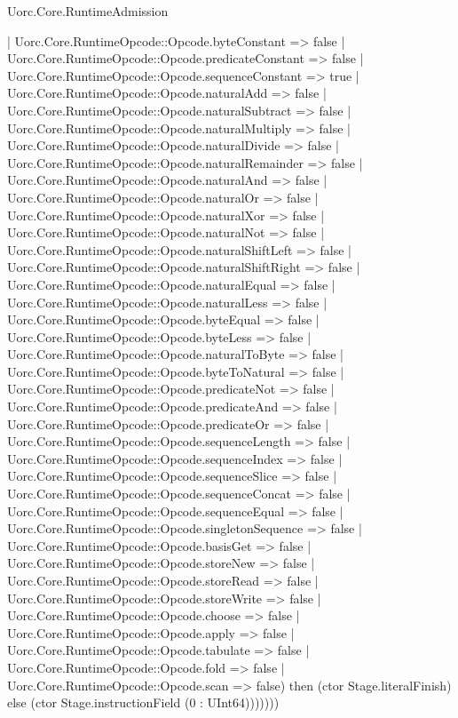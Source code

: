 \begin{lexlean}{Uorc.Core.RuntimeAdmission}
\begin{semanticmodule}
{              | Uorc.Core.RuntimeOpcode::Opcode.byteConstant => false
              | Uorc.Core.RuntimeOpcode::Opcode.predicateConstant => false
              | Uorc.Core.RuntimeOpcode::Opcode.sequenceConstant => true
              | Uorc.Core.RuntimeOpcode::Opcode.naturalAdd => false
              | Uorc.Core.RuntimeOpcode::Opcode.naturalSubtract => false
              | Uorc.Core.RuntimeOpcode::Opcode.naturalMultiply => false
              | Uorc.Core.RuntimeOpcode::Opcode.naturalDivide => false
              | Uorc.Core.RuntimeOpcode::Opcode.naturalRemainder => false
              | Uorc.Core.RuntimeOpcode::Opcode.naturalAnd => false
              | Uorc.Core.RuntimeOpcode::Opcode.naturalOr => false
              | Uorc.Core.RuntimeOpcode::Opcode.naturalXor => false
              | Uorc.Core.RuntimeOpcode::Opcode.naturalNot => false
              | Uorc.Core.RuntimeOpcode::Opcode.naturalShiftLeft => false
              | Uorc.Core.RuntimeOpcode::Opcode.naturalShiftRight => false
              | Uorc.Core.RuntimeOpcode::Opcode.naturalEqual => false
              | Uorc.Core.RuntimeOpcode::Opcode.naturalLess => false
              | Uorc.Core.RuntimeOpcode::Opcode.byteEqual => false
              | Uorc.Core.RuntimeOpcode::Opcode.byteLess => false
              | Uorc.Core.RuntimeOpcode::Opcode.naturalToByte => false
              | Uorc.Core.RuntimeOpcode::Opcode.byteToNatural => false
              | Uorc.Core.RuntimeOpcode::Opcode.predicateNot => false
              | Uorc.Core.RuntimeOpcode::Opcode.predicateAnd => false
              | Uorc.Core.RuntimeOpcode::Opcode.predicateOr => false
              | Uorc.Core.RuntimeOpcode::Opcode.sequenceLength => false
              | Uorc.Core.RuntimeOpcode::Opcode.sequenceIndex => false
              | Uorc.Core.RuntimeOpcode::Opcode.sequenceSlice => false
              | Uorc.Core.RuntimeOpcode::Opcode.sequenceConcat => false
              | Uorc.Core.RuntimeOpcode::Opcode.sequenceEqual => false
              | Uorc.Core.RuntimeOpcode::Opcode.singletonSequence => false
              | Uorc.Core.RuntimeOpcode::Opcode.basisGet => false
              | Uorc.Core.RuntimeOpcode::Opcode.storeNew => false
              | Uorc.Core.RuntimeOpcode::Opcode.storeRead => false
              | Uorc.Core.RuntimeOpcode::Opcode.storeWrite => false
              | Uorc.Core.RuntimeOpcode::Opcode.choose => false
              | Uorc.Core.RuntimeOpcode::Opcode.apply => false
              | Uorc.Core.RuntimeOpcode::Opcode.tabulate => false
              | Uorc.Core.RuntimeOpcode::Opcode.fold => false
              | Uorc.Core.RuntimeOpcode::Opcode.scan => false) then (ctor Stage.literalFinish) else (ctor Stage.instructionField (0 : UInt64)))))))
}
\end{semanticmodule}
\end{lexlean}

